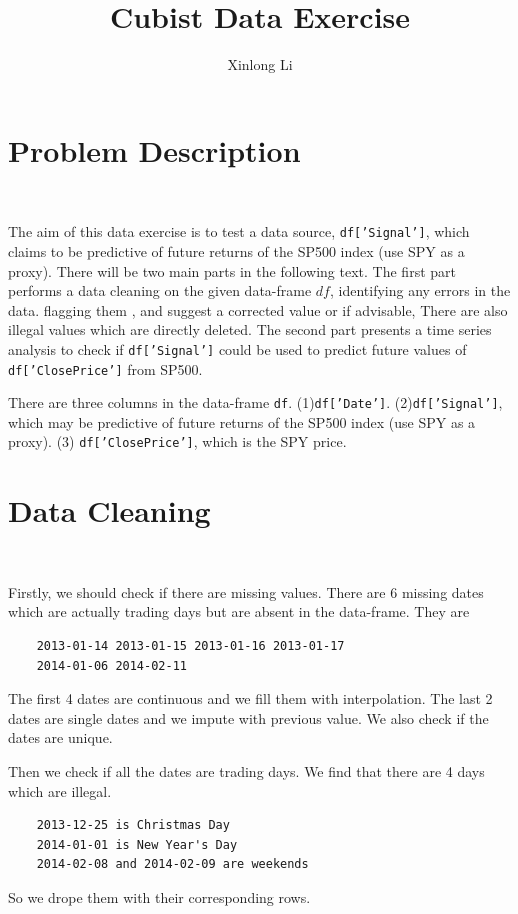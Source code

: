 \documentclass[11pt, oneside]{article}   	%
\title{Cubist Data Exercise}
\author{Xinlong Li}
\date{}							%
\begin{document}
\maketitle
\section{Problem Description}


\


The aim of this data exercise is to test a data source, \texttt{df['Signal']}, which claims to be predictive of future returns of the SP500 index (use SPY as a proxy). There will be two main parts in the following text. The first part performs a data cleaning on the given data-frame $df$, identifying any errors in the data. flagging them , and suggest a corrected value or if advisable, There are also illegal values which are directly deleted. The second part presents a time series analysis to check if \texttt{df['Signal']} could be used to predict future values of \texttt{df['ClosePrice']} from SP500.

There are three columns in the data-frame \texttt{df}. (1)\texttt{df['Date']}. (2)\texttt{df['Signal']}, which may be predictive of future returns of the SP500 index (use SPY as a proxy). (3)  \texttt{df['ClosePrice']},  which is the SPY price.



\section{Data Cleaning}

\

Firstly, we should check if there are missing values. There are 6 missing dates which are actually trading days but are absent in the data-frame. They are
\begin{lstlisting}
	2013-01-14 2013-01-15 2013-01-16 2013-01-17
	2014-01-06 2014-02-11
\end{lstlisting}
The first 4 dates are continuous and we fill them with interpolation. The last 2 dates are single dates and we impute with previous value. We also check if  the dates are unique.

Then we check if all the dates are trading days.  We find  that there are 4 days which are illegal. 
\begin{lstlisting}
	2013-12-25 is Christmas Day
	2014-01-01 is New Year's Day 
	2014-02-08 and 2014-02-09 are weekends
\end{lstlisting}
So we drope them with their corresponding rows.
\end{document}
